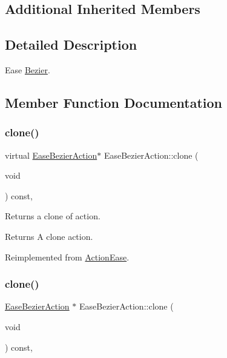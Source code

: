 \subsection*{Additional Inherited Members}


\subsection{Detailed Description}
Ease \hyperlink{structBezier}{Bezier}. 

\subsection{Member Function Documentation}
\mbox{\label{classEaseBezierAction_ae097f3480deee8064133c6e479c45020}} 
\subsubsection{\texorpdfstring{clone()}{clone()}\hspace{0.1cm}{\footnotesize\ttfamily [1/2]}}
{\footnotesize\ttfamily virtual \hyperlink{classEaseBezierAction}{Ease\+Bezier\+Action}$\ast$ Ease\+Bezier\+Action\+::clone (\begin{DoxyParamCaption}\item[{void}]{ }\end{DoxyParamCaption}) const\hspace{0.3cm}{\ttfamily [override]}, {\ttfamily [virtual]}}

Returns a clone of action.

\begin{DoxyReturn}{Returns}
A clone action. 
\end{DoxyReturn}


Reimplemented from \hyperlink{classActionEase_a39bec93fe161fb732a74d8e51a2fe08b}{Action\+Ease}.

\mbox{\label{classEaseBezierAction_a8d25557473e4f02ab18fe846ed193e06}} 
\subsubsection{\texorpdfstring{clone()}{clone()}\hspace{0.1cm}{\footnotesize\ttfamily [2/2]}}
{\footnotesize\ttfamily \hyperlink{classEaseBezierAction}{Ease\+Bezier\+Action} $\ast$ Ease\+Bezier\+Action\+::clone (\begin{DoxyParamCaption}\item[{void}]{ }\end{DoxyParamCaption}) const\hspace{0.3cm}{\ttfamily [override]}, {\ttfamily [virtual]}}

